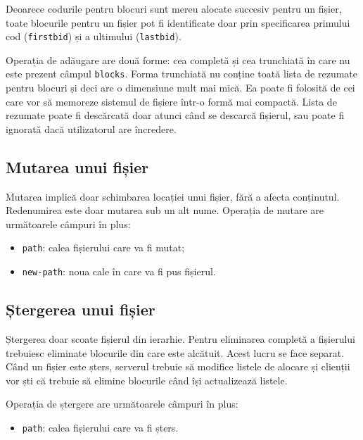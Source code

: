 \documentclass[a4wide,12pt]{report}
\newcommand{\cod}[1]{\texttt{#1}}
\begin{document}
Deoarece codurile pentru blocuri sunt mereu alocate succesiv pentru un fișier, toate blocurile pentru un fișier pot fi
identificate doar prin specificarea primului cod (\cod{firstbid}) și a ultimului (\cod{lastbid}).

Operația de adăugare are două forme: cea completă și cea trunchiată în care nu este prezent câmpul \cod{blocks}. Forma
trunchiată nu conține toată lista de rezumate pentru blocuri și deci are o dimensiune mult mai mică. Ea poate fi
folosită de cei care vor să memoreze sistemul de fișiere într-o formă mai compactă. Lista de rezumate poate fi
descărcată doar atunci când se descarcă fișierul, sau poate fi ignorată dacă utilizatorul are încredere.

\subsection{Mutarea unui fișier} %

Mutarea implică doar schimbarea locației unui fișier, fără a afecta conținutul. Redenumirea este doar mutarea sub un alt
nume. Operația de mutare are următoarele câmpuri în plus:

\begin{itemize}
    \item \cod{path}: calea fișierului care va fi mutat;
    \item \cod{new-path}: noua cale în care va fi pus fișierul.
\end{itemize}

\subsection{Ștergerea unui fișier} %

Ștergerea doar scoate fișierul din ierarhie. Pentru eliminarea completă a fișierului trebuiesc eliminate blocurile din
care este alcătuit. Acest lucru se face separat. Când un fișier este șters, serverul trebuie să modifice listele de
alocare și clienții vor ști că trebuie să elimine blocurile când își actualizează listele.

Operația de ștergere are următoarele câmpuri în plus:

\begin{itemize}
    \item \cod{path}: calea fișierului care va fi șters.
\end{itemize}
\end{document}
